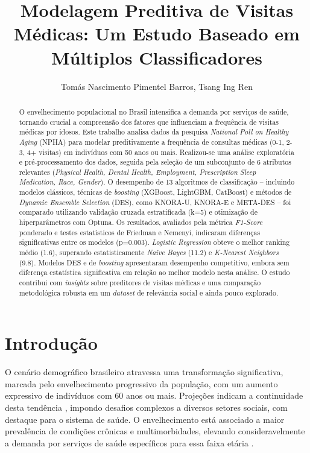 \documentclass[12pt]{article}
\title{Modelagem Preditiva de Visitas Médicas: Um Estudo Baseado em Múltiplos Classificadores}
\author{Tomás Nascimento Pimentel Barros\inst{1}, Tsang Ing Ren\inst{1}}
\begin{document}
 

\maketitle
\setcounter{page}{1}

\begin{abstract}
O envelhecimento populacional no Brasil intensifica a demanda por serviços de saúde, tornando crucial a compreensão dos fatores que influenciam a frequência de visitas médicas por idosos. Este trabalho analisa dados da pesquisa \textit{National Poll on Healthy Aging} (NPHA) para modelar preditivamente a frequência de consultas médicas (0-1, 2-3, 4+ visitas) em indivíduos com 50 anos ou mais. Realizou-se uma análise exploratória e pré-processamento dos dados, seguida pela seleção de um subconjunto de 6 atributos relevantes (\textit{Physical Health, Dental Health, Employment, Prescription Sleep Medication, Race, Gender}). O desempenho de 13 algoritmos de classificação – incluindo modelos clássicos, técnicas de \textit{boosting} (XGBoost, LightGBM, CatBoost) e métodos de \textit{Dynamic Ensemble Selection} (DES), como KNORA-U, KNORA-E e META-DES – foi comparado utilizando validação cruzada estratificada (k=5) e otimização de hiperparâmetros com Optuna. Os resultados, avaliados pela métrica \textit{F1-Score} ponderado e testes estatísticos de Friedman e Nemenyi, indicaram diferenças significativas entre os modelos (p=0.003). \textit{Logistic Regression} obteve o melhor ranking médio (1.6), superando estatisticamente \textit{Naive Bayes} (11.2) e \textit{K-Nearest Neighbors} (9.8). Modelos DES e de \textit{boosting} apresentaram desempenho competitivo, embora sem diferença estatística significativa em relação ao melhor modelo nesta análise. O estudo contribui com \textit{insights} sobre preditores de visitas médicas e uma comparação metodológica robusta em um \textit{dataset} de relevância social e ainda pouco explorado.
\end{abstract}

\section{Introdução}
O cenário demográfico brasileiro atravessa uma transformação significativa, marcada pelo envelhecimento progressivo da população, com um aumento expressivo de indivíduos com 60 anos ou mais. Projeções indicam a continuidade desta tendência \cite{IBGE2019}, impondo desafios complexos a diversos setores sociais, com destaque para o sistema de saúde. O envelhecimento está associado a maior prevalência de condições crônicas e multimorbidades, elevando consideravelmente a demanda por serviços de saúde específicos para essa faixa etária \cite{MCKG2013}.
\end{document}
